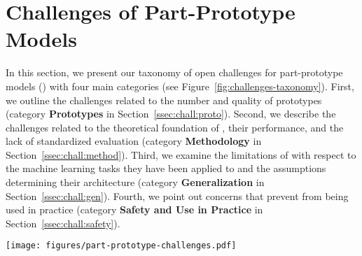 \section{Challenges of Part-Prototype Models}
\label{sec:challenges}

In this section, we present our taxonomy of open challenges for part-prototype models (\ppms) with four main categories (see Figure~\ref{fig:challenges-taxonomy}).
First, we outline the challenges related to the number and quality of prototypes (category \textbf{Prototypes} in Section~\ref{ssec:chall:proto}). Second, we describe the challenges related to the theoretical foundation of \ppms, their performance, and the lack of standardized evaluation (category \textbf{Methodology} in Section~\ref{ssec:chall:method}). Third, we examine the limitations of \ppms with respect to the machine learning tasks they have been applied to and the assumptions determining their architecture (category \textbf{Generalization} in Section~\ref{ssec:chall:gen}). 
Fourth, we point out concerns that prevent \ppms from being used in practice (category \textbf{Safety and Use in Practice} in Section~\ref{ssec:chall:safety}).
\begin{figure*}
    \centering
 \texttt{[image: figures/part-prototype-challenges.pdf]}
    \caption{Taxonomy of challenges that current (2024) part-prototype models face.}
    \label{fig:challenges-taxonomy}
\end{figure*}
